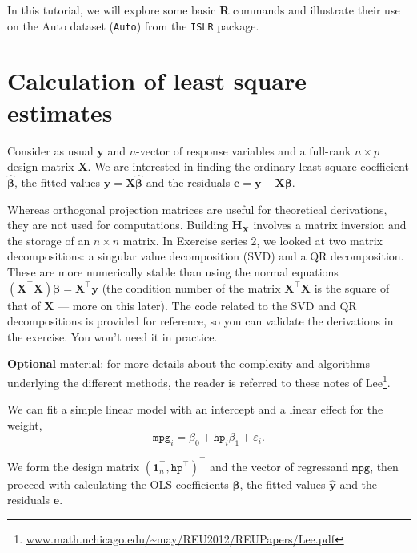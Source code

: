 \documentclass[]{book}
\let\rmarkdownfootnote\footnote%
\def\footnote{\protect\rmarkdownfootnote}
\renewcommand{\href}[2]{#2\footnote{\url{#1}}}
\theoremstyle{definition}
\theoremstyle{definition}
\theoremstyle{definition}
\theoremstyle{remark}
\begin{document}
In this tutorial, we will explore some basic \textbf{R} commands and
illustrate their use on the Auto dataset (\texttt{Auto}) from the
\texttt{ISLR} package.

\hypertarget{calculation-of-least-square-estimates}{%
\section{Calculation of least square
estimates}\label{calculation-of-least-square-estimates}}

Consider as usual \(\boldsymbol{y}\) and \(n\)-vector of response
variables and a full-rank \(n \times p\) design matrix \(\mathbf{X}\).
We are interested in finding the ordinary least square coefficient
\(\hat{\boldsymbol{\beta}}\), the fitted values
\(\hat{\boldsymbol{y}} = \mathbf{X}\hat{\boldsymbol{\beta}}\) and the
residuals
\(\boldsymbol{e} = \boldsymbol{y} - \mathbf{X}\boldsymbol{\beta}\).

Whereas orthogonal projection matrices are useful for theoretical
derivations, they are not used for computations. Building
\(\mathbf{H}_{\mathbf{X}}\) involves a matrix inversion and the storage
of an \(n \times n\) matrix. In Exercise series 2, we looked at two
matrix decompositions: a singular value decomposition (SVD) and a QR
decomposition. These are more numerically stable than using the normal
equations
\((\mathbf{X}^\top\mathbf{X})\boldsymbol{\beta} = \mathbf{X}^\top\boldsymbol{y}\)
(the condition number of the matrix \(\mathbf{X}^\top\mathbf{X}\) is the
square of that of \(\mathbf{X}\) --- more on this later). The code
related to the SVD and QR decompositions is provided for reference, so
you can validate the derivations in the exercise. You won't need it in
practice.

\textbf{Optional} material: for more details about the complexity and
algorithms underlying the different methods, the reader is referred to
these notes of
\href{www.math.uchicago.edu/~may/REU2012/REUPapers/Lee.pdf}{Lee}.

We can fit a simple linear model with an intercept and a linear effect
for the weight,
\[ \texttt{mpg}_i = \beta_0 + \texttt{hp}_i\beta_1 +\varepsilon_i.\]

We form the design matrix
\((\boldsymbol{1}_n^\top, \texttt{hp}^\top)^\top\) and the vector of
regressand \(\texttt{mpg}\), then proceed with calculating the OLS
coefficients \(\hat{\boldsymbol{\beta}}\), the fitted values
\(\hat{\boldsymbol{y}}\) and the residuals \(\boldsymbol{e}\).
\end{document}

